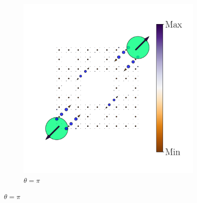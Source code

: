 \begin{figure}[h!]
\begin{minipage}[h!]{1.1\textwidth}
\begin{subfigure}[b!]{0.2 \textwidth}
         \end{subfigure}\hspace*{-0.5em}
          \begin{subfigure}[b!]{0.2 \textwidth}
             \caption*{$\theta = \pi$}
             \includegraphics[width=\textwidth]{Imagenes/Resultados_pump_Fractal/xy/hoti_pomp_xy_pos5.pdf}
         \end{subfigure}\hspace*{-0.5em}
     \end{minipage}\vspace*{-1em}
     

\end{figure}
